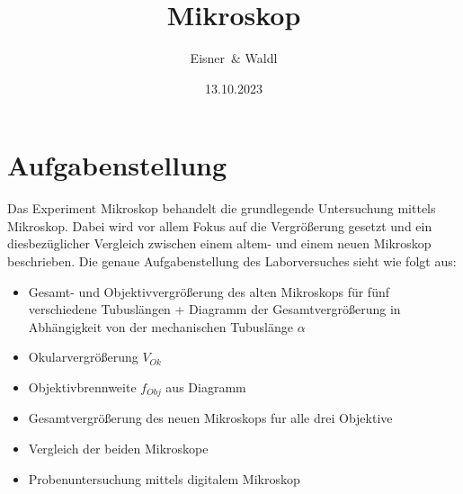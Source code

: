 \documentclass[12pt,a4paper,twoside]{article}
\begin{document}
\newcommand\laboratorynumber{2}
\title{Mikroskop}
\newcommand\supervisor{Nico Knefz}
\newcommand\groupnumber{42}

\newcommand\participantonelastname{Eisner}
\newcommand\participantonefirstname{Nico}
\newcommand\participantoneid{12214121}
\newcommand\participanttwolastname{Waldl}
\newcommand\participanttwofirstname{Philip}
\newcommand\participanttwoid{12214120}
\author{\participantonelastname \ \& \participanttwolastname}

\newcommand\degreeid{UB 033 678}
\newcommand\semester{23WS}
\date{13.10.2023}

\newcommand\coursetitle{Laborübungen 2: \\ Elektrizität, Magnetismus, Optik}

%



\tableofcontents
\newpage

\section{Aufgabenstellung} %
Das Experiment Mikroskop behandelt die grundlegende Untersuchung mittels Mikroskop. 
Dabei wird vor allem Fokus auf die Vergrößerung gesetzt und ein diesbezüglicher Vergleich zwischen einem altem- und einem neuen Mikroskop beschrieben.
Die genaue Aufgabenstellung des Laborversuches sieht wie folgt aus:

\begin{itemize}
    \item Gesamt- und Objektivvergrößerung des alten Mikroskops für fünf verschiedene Tubuslängen 
    + Diagramm der Gesamtvergrößerung in Abhängigkeit von der mechanischen Tubuslänge 
    $\alpha$
    \item Okularvergrößerung $V_{Ok}$ 
    \item Objektivbrennweite $f_{Obj}$ aus Diagramm
    \item Gesamtvergrößerung des neuen Mikroskops fur alle drei Objektive
    \item Vergleich der beiden Mikroskope
    \item Probenuntersuchung mittels digitalem Mikroskop
\end{itemize}
\end{document}
